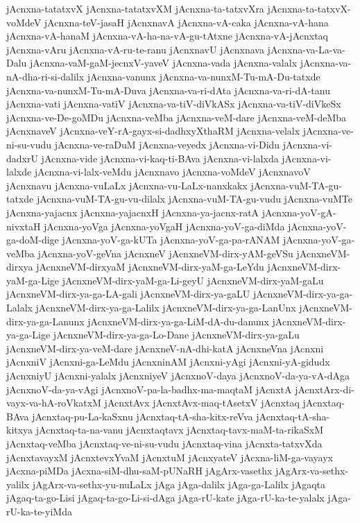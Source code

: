 {jAcnxna-tatatxvX
jAcnxna-tatatxvXM
jAcnxna-ta-tatxvXra
jAcnxna-ta-tatxvX-voMdeV
jAcnxna-teV-jasaH
jAcnxnavA
jAcnxna-vA-caka
jAcnxna-vA-hana
jAcnxna-vA-hanaM
jAcnxna-vA-ha-na-vA-gu-tAtxne
jAcnxna-vA-jAcnxtaq
jAcnxna-vAru
jAcnxna-vA-ru-te-ranu
jAcnxnavU
jAcnxnava
jAcnxna-va-La-va-Dalu
jAcnxna-vaM-gaM-jecnxV-yaveV
jAcnxna-vada
jAcnxna-valalx
jAcnxna-va-nA-dha-ri-si-dalilx
jAcnxna-vanunx
jAcnxna-va-nunxM-Tu-mA-Du-tatxde
jAcnxna-va-nunxM-Tu-mA-Duva
jAcnxna-va-ri-dAta
jAcnxna-va-ri-dA-tanu
jAcnxna-vati
jAcnxna-vatiV
jAcnxna-va-tiV-diVkASx
jAcnxna-va-tiV-diVkeSx
jAcnxna-ve-De-goMDu
jAcnxna-veMba
jAcnxna-veM-dare
jAcnxna-veM-deMba
jAcnxnaveV
jAcnxna-veY-rA-gayx-si-dadhxyXthaRM
jAcnxna-velalx
jAcnxna-ve-ni-su-vudu
jAcnxna-ve-raDuM
jAcnxna-veyedx
jAcnxna-vi-Didu
jAcnxna-vi-dadxrU
jAcnxna-vide
jAcnxna-vi-kaq-ti-BAva
jAcnxna-vi-lalxda
jAcnxna-vi-lalxde
jAcnxna-vi-lalx-veMdu
jAcnxnavo
jAcnxna-voMdeV
jAcnxnavoV
jAcnxnavu
jAcnxna-vuLaLx
jAcnxna-vu-LaLx-nanxkakx
jAcnxna-vuM-TA-gu-tatxde
jAcnxna-vuM-TA-gu-vu-dilalx
jAcnxna-vuM-TA-gu-vudu
jAcnxna-vuMTe
jAcnxna-yajacnx
jAcnxna-yajacnxH
jAcnxna-ya-jacnx-ratA
jAcnxna-yoV-gA-nivxtaH
jAcnxna-yoVga
jAcnxna-yoVgaH
jAcnxna-yoV-ga-diMda
jAcnxna-yoV-ga-doM-dige
jAcnxna-yoV-ga-kUTa
jAcnxna-yoV-ga-pa-rANAM
jAcnxna-yoV-ga-veMba
jAcnxna-yoV-geVna
jAcnxneV
jAcnxneVM-dirx-yAM-geVSu
jAcnxneVM-dirxya
jAcnxneVM-dirxyaM
jAcnxneVM-dirx-yaM-ga-LeYdu
jAcnxneVM-dirx-yaM-ga-Lige
jAcnxneVM-dirx-yaM-ga-Li-geyU
jAcnxneVM-dirx-yaM-gaLu
jAcnxneVM-dirx-ya-ga-LA-gali
jAcnxneVM-dirx-ya-gaLU
jAcnxneVM-dirx-ya-ga-Lalalx
jAcnxneVM-dirx-ya-ga-Lalilx
jAcnxneVM-dirx-ya-ga-LanUnx
jAcnxneVM-dirx-ya-ga-Lanunx
jAcnxneVM-dirx-ya-ga-LiM-dA-du-danunx
jAcnxneVM-dirx-ya-ga-Lige
jAcnxneVM-dirx-ya-ga-Lo-Dane
jAcnxneVM-dirx-ya-gaLu
jAcnxneVM-dirx-ya-veM-dare
jAcnxneV-nA-dhi-katA
jAcnxneVna
jAcnxni
jAcnxniV
jAcnxni-ga-LeMdu
jAcnxninAM
jAcnxni-yAgi
jAcnxni-yA-gidudx
jAcnxniyU
jAcnxni-yalalx
jAcnxniyeV
jAcnxnoV-daya
jAcnxnoV-da-ya-vA-dAga
jAcnxnoV-da-ya-vAgi
jAcnxnoV-pa-la-badhx-ma-maqtaM
jAcnxtA
jAcnxtArx-di-vayx-va-hA-roVkatxM
jAcnxtAvx
jAcnxtAvx-maq-tAsetxV
jAcnxtaq
jAcnxtaq-BAva
jAcnxtaq-pu-La-kaSxnu
jAcnxtaq-tA-sha-kitx-reVva
jAcnxtaq-tA-sha-kitxya
jAcnxtaq-ta-na-vanu
jAcnxtaqtavx
jAcnxtaq-tavx-maM-ta-rikaSxM
jAcnxtaq-veMba
jAcnxtaq-ve-ni-su-vudu
jAcnxtaq-vina
jAcnxta-tatxvXda
jAcnxtavayxM
jAcnxtevxYvaM
jAcnxtuM
jAcnxyateV
jAcxna-liM-ga-vayayx
jAcxna-piMDa
jAcxna-siM-dhu-saM-pUNaRH
jAgArx-vasethx
jAgArx-va-sethx-yalilx
jAgArx-va-sethx-yu-nuLaLx
jAga
jAga-dalilx
jAga-ga-Lalilx
jAgaqta
jAgaq-ta-go-Lisi
jAgaq-ta-go-Li-si-dAga
jAga-rU-kate
jAga-rU-ka-te-yalalx
jAga-rU-ka-te-yiMda
}
